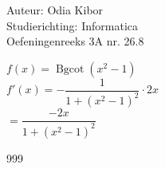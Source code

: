 \documentclass[a4paper]{article}
\newcommand{\Bgcot}{\operatorname{Bgcot}}
\begin{document}
  
\noindent \large Auteur: Odia Kibor \\
\noindent \large Studierichting: Informatica\\
\noindent \large Oefeningenreeks 3A nr. 26.8\\

\medskip

\normalsize


$f(x) = \Bgcot(x^2 - 1)$\\

$f'(x) = -\dfrac{1}{1+(x^2-1)^2} \cdot 2x$\\

$= \dfrac{-2x}{1+(x^2-1)^2}$

















\begin{thebibliography}{999}
\end{thebibliography}
\end{document}
